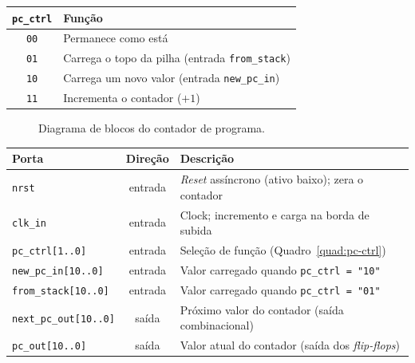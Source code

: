 \documentclass[
	12pt,				%
	oneside,			%
	a4paper,			%
	sumario = tradicional,
	english,			%
	brazilian			%
	]{abntex2}
\newcommand{\fio}{2.2} %
\newcommand{\pentrada}[3]{\draw[->,#3] ($(bloco.west)+(-\fio,#1)$) -- ($(bloco.west)+(0,#1)$);
  \node[port, anchor=east] at ($(bloco.west)+(-\fio-0.1,#1)$) {#2};}
\newcommand{\psaida}[3]{\draw[->,#3] ($(bloco.east)+(0,#1)$) -- ($(bloco.east)+(\fio,#1)$);
  \node[port, anchor=west] at ($(bloco.east)+(\fio+0.1,#1)$) {#2};}
\begin{document}
\begin{quadro}[!htb]
  \SingleSpacing
  \caption{Funções do contador de programa, selecionadas por \texttt{pc\_ctrl}.}
  \label{quad:pc-ctrl}
  \centering
  \begin{tabular}{cl}
    \hline
    \texttt{pc\_ctrl} & Função \\ \hline
    \texttt{00} & Permanece como está \\
    \texttt{01} & Carrega o topo da pilha (entrada \texttt{from\_stack}) \\
    \texttt{10} & Carrega um novo valor (entrada \texttt{new\_pc\_in}) \\
    \texttt{11} & Incrementa o contador ($+1$) \\ \hline
  \end{tabular}
\end{quadro}

\begin{figure}[!htb]
\caption{Diagrama de blocos do contador de programa.}\label{fig:bloco-prog-cnt}
\centering
{}
\end{figure}

\begin{quadro}[!htb]
  \SingleSpacing
  \caption{Portas do contador de programa.}
  \label{quad:portas-prog-cnt}
  \centering
  \begin{tabular}{lcp{8.8cm}}
    \hline
    Porta & Direção & Descrição \\ \hline
    \texttt{nrst} & entrada & \textit{Reset} assíncrono (ativo baixo); zera o contador \\
    \texttt{clk\_in} & entrada & Clock; incremento e carga na borda de subida \\
    \texttt{pc\_ctrl[1..0]} & entrada & Seleção de função (Quadro~\ref{quad:pc-ctrl}) \\
    \texttt{new\_pc\_in[10..0]} & entrada & Valor carregado quando \texttt{pc\_ctrl = "10"} \\
    \texttt{from\_stack[10..0]} & entrada & Valor carregado quando \texttt{pc\_ctrl = "01"} \\
    \texttt{next\_pc\_out[10..0]} & saída & Próximo valor do contador (saída combinacional) \\
    \texttt{pc\_out[10..0]} & saída & Valor atual do contador (saída dos \textit{flip-flops}) \\ \hline
  \end{tabular}
\end{quadro}
\end{document}
